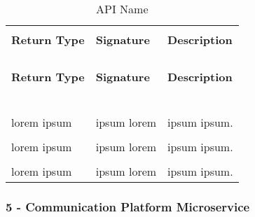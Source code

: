 \begin{longtable}{p{}p{}p{}}
    \caption{API Name}
    \vspace{0.5em}\\
    \hline
    \vspace{0.5em}\\
    \textbf{Return Type} & \textbf{Signature} & \textbf{Description} \\
    \vspace{0.5em}\\
    \hline
    \vspace{0.5em}\\
    \endfirsthead
    \vspace{0.5em}\\
    \hline
    \vspace{0.5em}\\
    \textbf{Return Type} & \textbf{Signature} & \textbf{Description} \\
    \vspace{0.5em}\\
    \hline
    \vspace{0.5em}\\
    \endhead
    
    \vspace{0.5em}\\
    \hline
    \vspace{0.5em}\\
    \endfoot
    
    \vspace{0.5em}\\
    \hline
    \vspace{0.5em}\\
    \endlastfoot
    
    lorem ipsum &
    ipsum lorem &
    ipsum ipsum. \\
    \vspace{0.5em}\\
    lorem ipsum &
    ipsum lorem &
    ipsum ipsum. \\
    \vspace{0.5em}\\
    lorem ipsum &
    ipsum lorem &
    ipsum ipsum. \\

\end{longtable}

\subsubsection{5 - Communication Platform Microservice}


